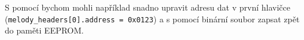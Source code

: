 S pomocí  bychom mohli například snadno upravit adresu dat
v první hlavičce (\lstinline[language=Poke]|melody_headers[0].address = 0x0123|)
a s pomocí  binární soubor zapsat zpět do paměti
EEPROM.



